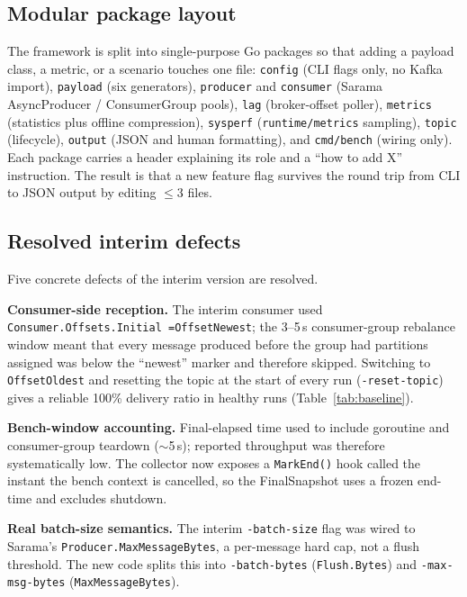 \documentclass[conference]{IEEEtran}
\begin{document}
\subsection{Modular package layout}
The framework is split into single-purpose Go packages so that adding
a payload class, a metric, or a scenario touches one file:
\texttt{config} (CLI flags only, no Kafka import),
\texttt{payload} (six generators), \texttt{producer} and
\texttt{consumer} (Sarama AsyncProducer / ConsumerGroup pools),
\texttt{lag} (broker-offset poller), \texttt{metrics} (statistics
plus offline compression), \texttt{sysperf} (\texttt{runtime/metrics}
sampling), \texttt{topic} (lifecycle), \texttt{output} (JSON and
human formatting), and \texttt{cmd/bench} (wiring only). Each package
carries a header explaining its role and a ``how to add X''
instruction. The result is that a new feature flag survives the round
trip from CLI to JSON output by editing $\le$3 files.

\subsection{Resolved interim defects}
\label{sec:fixes}
Five concrete defects of the interim version are resolved.

\textbf{Consumer-side reception.} The interim consumer used
\texttt{Consumer.Offsets.Initial =\linebreak OffsetNewest}; the
3--5\,s consumer-group rebalance window meant that every message
produced before the group had partitions assigned was below the
``newest'' marker and therefore skipped. Switching to
\texttt{OffsetOldest} and resetting the topic at the start of every
run (\texttt{-reset-topic}) gives a reliable 100\% delivery ratio in
healthy runs (Table~\ref{tab:baseline}).

\textbf{Bench-window accounting.} Final-elapsed time used to include
goroutine and consumer-group teardown ($\sim$5\,s); reported throughput
was therefore systematically low. The collector now exposes a
\texttt{MarkEnd()} hook called the instant the bench context is
cancelled, so the FinalSnapshot uses a frozen end-time and excludes
shutdown.

\textbf{Real batch-size semantics.} The interim
\texttt{-batch-size} flag was wired to Sarama's
\texttt{Producer.MaxMessageBytes}, a per-message hard cap, not a flush
threshold. The new code splits this into \texttt{-batch-bytes}
(\texttt{Flush.Bytes}) and \texttt{-max-msg-bytes}
(\texttt{MaxMessageBytes}).
\end{document}
